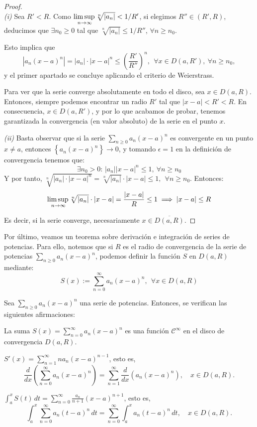  \begin{proof} \hfill \\
    \textit{(i)} Sea $R'<R$. Como $\underset{n\to\infty}{\mbox{lim\,sup\,}} \sqrt[n]{|a_n|} < 1/R'$, si elegimos $R''\in (R',R)$, deducimos que $\exists n_0\geq 0$ tal que $\sqrt[n]{|a_n|} \leq 1/R''$, $\forall n\geq n_0$.

    Esto implica que
    \[
      \left| a_n (x-a)^n\right| = |a_n|\cdot|x-a|^n \leq \left(\frac{R'}{R''}\right)^n, \ \ \forall x\in D(a,R'), \ \forall n\geq n_0,
    \]
    y el primer apartado se concluye aplicando el criterio de Weierstrass.

    Para ver que la serie converge absolutamente en todo el disco, sea $x \in D(a,R)$. Entonces, siempre podemos encontrar un radio $R'$ tal que $|x-a| < R' < R$. En consecuencia, $x \in D(a,R')$, y por lo que acabamos de probar, tenemos garantizada la convergencia (en valor absoluto) de la serie en el punto $x$.

    \textit{(ii)} Basta observar que si la serie $\sum_{n\geq 0} a_n (x-a)^n$ es convergente en un punto $x\not= a$, entonces $\left\{ a_n (x-a)^n \right\} \to 0$, y tomando $\epsilon = 1$ en la definición de convergencia tenemos que:
    \[
      \exists n_0>0: \,  |a_n| |x-a|^n \leq 1, \ \forall n\geq n_0
    \]
    Y por tanto, $\sqrt[n]{|a_n|\cdot |x-a|^n} = \sqrt[n]{|a_n|}\cdot|x-a| \leq 1, \ \ \forall n\geq n_0$. Entonces: $$\underset{n\to\infty}{\mbox{lim\,sup\,}} \sqrt[n]{|a_n|} \cdot |x-a| =\frac{|x-a|}{R} \leq 1 \implies |x-a| \le R$$

    Es decir, si la serie converge, necesariamente $x \in \overline{D(a,R)}.$
  \end{proof}

Por último, veamos un teorema sobre derivación e integración de series de potencias. Para ello, notemos que si $R$ es el radio de convergencia de la serie de potencias $\displaystyle\sum_{n\geq 0} a_n (x-a)^n$, podemos definir la función $S$ en $D(a,R)$ mediante: \[
  S(x):= \sum_{n= 0}^\infty a_n (x-a)^n
  , \ \ \forall x\in  D(a,R)
\]

\begin{nth} \label{14}
  Sea $\displaystyle\sum_{n\geq 0} a_n (x-a)^n$ una serie de potencias. Entonces, se verifican las siguientes afirmaciones:
  \begin{nlist}
  \item La suma $S(x)=\displaystyle\sum_{n= 0}^\infty a_n (x-a)^n$ es una función $\mathcal{C}^\infty$ en el disco de convergencia $D(a,R)$.
  \item $S'(x)= \displaystyle\sum_{n= 1}^\infty n a_n (x-a)^{n-1}$, esto es,
    \[
      \displaystyle\frac{d}{dx} \left( \sum_{n= 0}^\infty a_n (x-a)^n \right) =  \sum_{n= 1}^\infty \frac{d}{dx} \left( a_n (x-a)^n \right), \quad x \in D(a,R).
    \]
  \item
    $\displaystyle \int_a^x S(t)\, dt =   \sum_{n= 0}^\infty \frac{a_n}{n+1} (x-a)^{n+1}$, esto es,
    \[
      \int_a^x  \sum_{n= 0}^\infty a_n (t-a)^n \, dt
      =  \sum_{n= 0}^\infty \int_a^x a_n (t-a)^n \, dt, \quad x \in D(a,R).
    \]
  \end{nlist}
  \end{nth}

